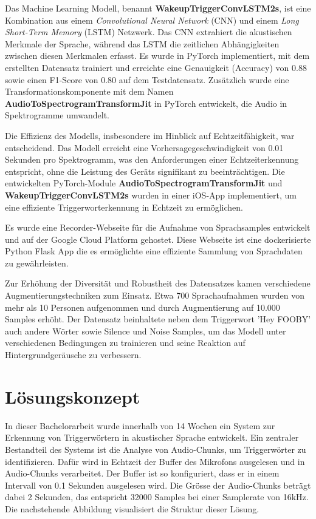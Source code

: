 \documentclass[11pt,a4paper]{article}
\begin{document}
\noindent
Das Machine Learning Modell, benannt \textbf{WakeupTriggerConvLSTM2s}, ist eine Kombination aus einem \textit{Convolutional Neural Network} (CNN) und einem \textit{Long Short-Term Memory} (LSTM) Netzwerk. Das CNN extrahiert die akustischen Merkmale der Sprache, während das LSTM die zeitlichen Abhängigkeiten zwischen diesen Merkmalen erfasst. Es wurde in PyTorch implementiert, mit dem erstellten Datensatz trainiert und erreichte eine Genauigkeit (Accuracy) von 0.88 sowie einen F1-Score von 0.80 auf dem Testdatensatz. Zusätzlich wurde eine Transformationskomponente mit dem Namen \textbf{AudioToSpectrogramTransformJit} in PyTorch entwickelt, die Audio in Spektrogramme umwandelt.

\noindent \newline
Die Effizienz des Modells, insbesondere im Hinblick auf Echtzeitfähigkeit, war entscheidend. Das Modell erreicht eine Vorhersagegeschwindigkeit von 0.01 Sekunden pro Spektrogramm, was den Anforderungen einer Echtzeiterkennung entspricht, ohne die Leistung des Geräts signifikant zu beeinträchtigen. Die entwickelten PyTorch-Module \textbf{AudioToSpectrogramTransformJit} und \textbf{WakeupTriggerConvLSTM2s} wurden in einer iOS-App implementiert, um eine effiziente Triggerworterkennung in Echtzeit zu ermöglichen.

\noindent \newline
Es wurde eine Recorder-Webseite für die Aufnahme von Sprachsamples entwickelt und auf der Google Cloud Platform gehostet. Diese Webseite ist eine dockerisierte Python Flask App die es ermöglichte eine effiziente Sammlung von Sprachdaten zu gewährleisten.

\noindent \newline
Zur Erhöhung der Diversität und Robustheit des Datensatzes kamen verschiedene Augmentierungstechniken zum Einsatz. Etwa 700 Sprachaufnahmen wurden von mehr als 10 Personen aufgenommen und durch Augmentierung auf 10.000 Samples erhöht. Der Datensatz beinhaltete neben dem Triggerwort 'Hey FOOBY' auch andere Wörter sowie Silence und Noise Samples, um das Modell unter verschiedenen Bedingungen zu trainieren und seine Reaktion auf Hintergrundgeräusche zu verbessern.


\newpage
\section{Lösungskonzept}
In dieser Bachelorarbeit wurde innerhalb von 14 Wochen ein System zur Erkennung von Triggerwörtern in akustischer Sprache entwickelt. Ein zentraler Bestandteil des Systems ist die Analyse von Audio-Chunks, um Triggerwörter zu identifizieren. Dafür wird in Echtzeit der Buffer des Mikrofons ausgelesen und in Audio-Chunks verarbeitet. Der Buffer ist so konfiguriert, dass er in einem Intervall von 0.1 Sekunden ausgelesen wird. Die Grösse der Audio-Chunks beträgt dabei 2 Sekunden, das entspricht 32000 Samples bei einer Samplerate von 16kHz. Die nachstehende Abbildung visualisiert die Struktur dieser Lösung.
\end{document}
